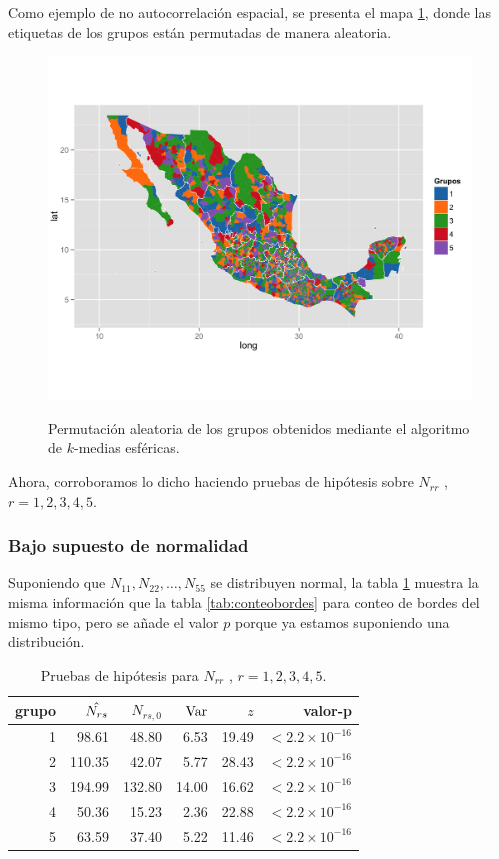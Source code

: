 Como ejemplo de no autocorrelación espacial, se presenta el mapa \ref{fig:rmap_5g_ej}, donde las etiquetas de los grupos están permutadas de manera aleatoria. 

\begin{figure}[!ht]
  \centering
  \includegraphics[width=\textwidth]{./maps/rmap5g.png} \\
  \caption{ Permutación aleatoria de los grupos obtenidos mediante el algoritmo de $k$-medias esféricas.}
  \label{fig:rmap_5g_ej}  
\end{figure}
Ahora, corroboramos lo dicho haciendo pruebas de hipótesis sobre $N_{rr}$ , $r=1, 2, 3, 4, 5$.

\subsubsection{Bajo supuesto de normalidad}
Suponiendo que $N_{11}, N_{22}, \dots, N_{55}$ se distribuyen normal, la tabla \ref{tab:conteobordesprueba} muestra la misma información que la tabla \ref{tab:conteobordes} para conteo de bordes del mismo tipo, pero se añade el valor $p$ porque ya estamos suponiendo una distribución.

\begin{table}[ht]
\centering
\begin{tabular}{rrrrrr}
  \hline
  grupo & $\Hat{N_{rs}}$  & $N_{rs,0}$ & ${\rm{Var}}$ & $z$ & valor-p \\ 
  \hline
  1 & 98.61 & 48.80 & 6.53 & 19.49 & $< 2.2 \times 10^{-16}$ \\ 
  2 & 110.35 & 42.07 & 5.77  & 28.43 & $< 2.2 \times 10^{-16}$ \\ 
  3 & 194.99 & 132.80 & 14.00 & 16.62 & $< 2.2 \times 10^{-16}$ \\ 
  4 & 50.36 & 15.23 & 2.36 & 22.88 & $< 2.2 \times 10^{-16}$ \\ 
  5 & 63.59 & 37.40 & 5.22 & 11.46 & $< 2.2 \times 10^{-16}$ \\ 
   \hline
\end{tabular}
\caption{Pruebas de hipótesis para $N_{rr}$ , $r=1, 2, 3, 4, 5$.}
\label{tab:conteobordesprueba}
\end{table}

